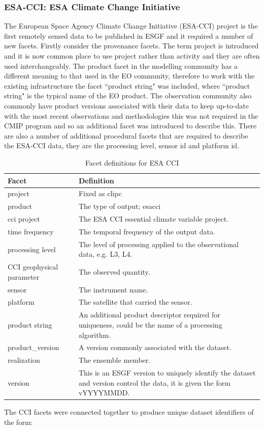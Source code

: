 \documentclass[final,1p,times,twocolumn,authoryear]{elsarticle}
\begin{document}
\subsubsection{ESA-CCI: ESA Climate Change Initiative}
The European Space Agency Climate Change Initiative (ESA-CCI) project is the first remotely sensed data to be published in ESGF and it required a number of new facets. Firstly consider the provenance facets. The term project is introduced and it is now common place to use project rather than activity and they are often used interchangeably. The product facet in the modelling community has a different meaning to that used in the EO community, therefore to work with the existing infrastructure the facet ``product string" was included, where ``product string" is the typical name of the EO product. The observation community also commonly have product versions associated with their data to keep up-to-date with the most recent observations and methodologies this was not required in the CMIP program and so an additional facet was introduced to describe this.  There are also a number of additional procedural facets that are required to describe the ESA-CCI data, they are the processing level, sensor id and platform id. 

\begin{table}[ht!]
\label{tab:cci}
\begin{tabular}{|p{3cm}|p{9.5cm}|}
\hline
\textbf{Facet}  & \textbf{Definition}  \\ \hline
project         & Fixed as clipc\\ \hline
product         & The type of output; esacci \\ \hline
cci project     & The ESA CCI essential climate variable project. \\ \hline
time frequency  & The temporal frequency of the output data.  \\ \hline
processing level    & The level of processing applied to the observational data, e.g. L3, L4.  \\ \hline
CCI geophysical parameter  & The observed quantity.  \\ \hline
sensor          & The instrument name. \\ \hline
platform        & The satellite that carried the sensor.    \\ \hline
product string  & An additional product descriptor required for uniqueness, could be the name of a processing algorithm. \\ \hline
product\_version & A version commonly associated with the dataset. \\
realization     & The ensemble member. \\ \hline
version         & This is an ESGF version to uniquely identify the dataset and version control the data, it is given the form vYYYYMMDD. \\
\hline

\end{tabular}
\caption{Facet definitions for ESA CCI}
\end{table}
The CCI facets were connected together to produce unique dataset identifiers of the form:
\end{document}
